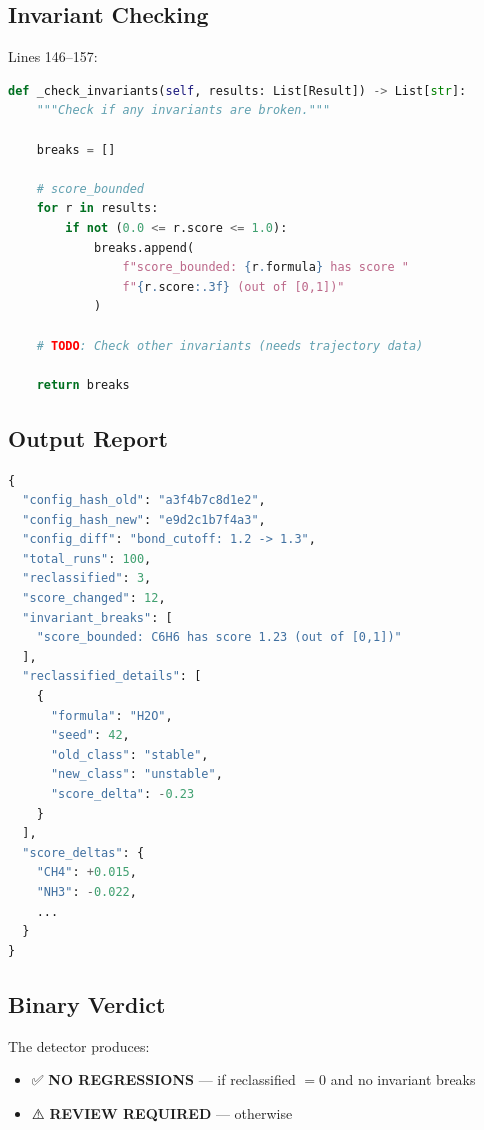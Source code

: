 \documentclass[11pt]{article}
\begin{document}
\subsection{Invariant Checking}

Lines 146--157:

\begin{lstlisting}[language=Python]
def _check_invariants(self, results: List[Result]) -> List[str]:
    """Check if any invariants are broken."""
    
    breaks = []
    
    # score_bounded
    for r in results:
        if not (0.0 <= r.score <= 1.0):
            breaks.append(
                f"score_bounded: {r.formula} has score "
                f"{r.score:.3f} (out of [0,1])"
            )
    
    # TODO: Check other invariants (needs trajectory data)
    
    return breaks
\end{lstlisting}

\subsection{Output Report}

\begin{lstlisting}[language=Python]
{
  "config_hash_old": "a3f4b7c8d1e2",
  "config_hash_new": "e9d2c1b7f4a3",
  "config_diff": "bond_cutoff: 1.2 -> 1.3",
  "total_runs": 100,
  "reclassified": 3,
  "score_changed": 12,
  "invariant_breaks": [
    "score_bounded: C6H6 has score 1.23 (out of [0,1])"
  ],
  "reclassified_details": [
    {
      "formula": "H2O",
      "seed": 42,
      "old_class": "stable",
      "new_class": "unstable",
      "score_delta": -0.23
    }
  ],
  "score_deltas": {
    "CH4": +0.015,
    "NH3": -0.022,
    ...
  }
}
\end{lstlisting}

\subsection{Binary Verdict}

The detector produces:
\begin{itemize}
\item ✅ \textbf{NO REGRESSIONS} — if reclassified $= 0$ and no invariant breaks
\item ⚠️ \textbf{REVIEW REQUIRED} — otherwise
\end{itemize}
\end{document}
